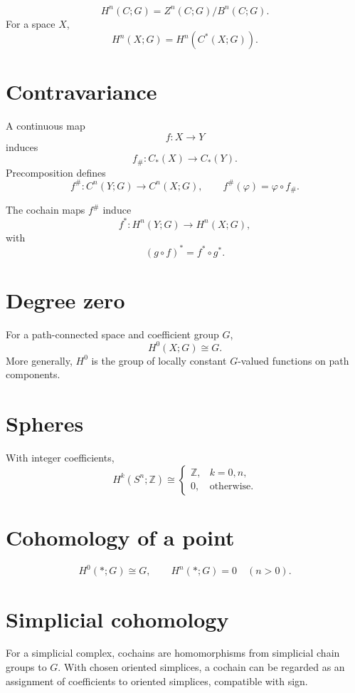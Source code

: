 \begin{definition}[Cohomology]
\label{def:viii28-cohomology}
\[
H^n(C;G)=Z^n(C;G)/B^n(C;G).
\]
For a space \(X\),
\[
H^n(X;G)=H^n(C^*(X;G)).
\]
\end{definition}

\section{Contravariance}

A continuous map
\[
f:X\to Y
\]
induces
\[
f_\#:C_*(X)\to C_*(Y).
\]
Precomposition defines
\[
f^\#:C^n(Y;G)\to C^n(X;G),
\qquad
f^\#(\varphi)=\varphi\circ f_\#.
\]

\begin{theorem}[Functoriality]
\label{thm:viii28-functoriality}
The cochain maps \(f^\#\) induce
\[
f^*:H^n(Y;G)\to H^n(X;G),
\]
with
\[
(g\circ f)^*=f^*\circ g^*.
\]
\end{theorem}

\section{Degree zero}

For a path-connected space and coefficient group \(G\),
\[
H^0(X;G)\cong G.
\]
More generally, \(H^0\) is the group of locally constant \(G\)-valued functions
on path components.

\section{Spheres}

With integer coefficients,
\[
H^k(S^n;\mathbb Z)\cong
\begin{cases}
\mathbb Z,&k=0,n,\\
0,&\text{otherwise}.
\end{cases}
\]

\section{Cohomology of a point}

\[
H^0(*;G)\cong G,
\qquad
H^n(*;G)=0\quad(n>0).
\]

\section{Simplicial cohomology}

For a simplicial complex, cochains are homomorphisms from simplicial chain
groups to \(G\).  With chosen oriented simplices, a cochain can be regarded as
an assignment of coefficients to oriented simplices, compatible with sign.

